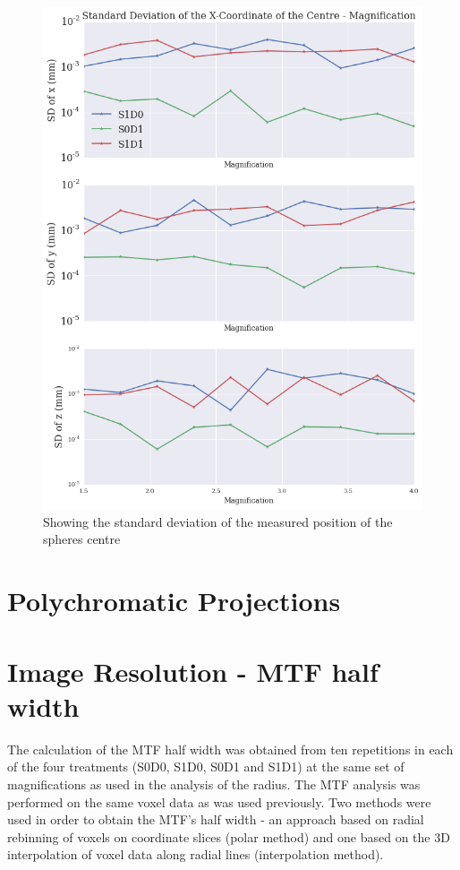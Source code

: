 \documentclass[
  twoside,
  11pt, a4paper,
  footinclude=true,
  headinclude=true,
  cleardoublepage=empty
]{scrbook}
\begin{document}
\begin{figure}[h!]
  \centering
    \includegraphics[width=\textwidth]{figures/output_22_0.png}
    \caption{Showing the standard deviation of the measured position of the spheres centre}
        \label{spherecentrevar}
\end{figure}

\section{Polychromatic Projections}

\section{Image Resolution - MTF half width}

The calculation of the MTF half width was obtained from ten repetitions in each of the four treatments (S0D0, S1D0, S0D1 and S1D1) at the same set of magnifications as used in the analysis of the radius. The MTF analysis was performed on the same voxel data as was used previously. Two methods were used in order to obtain the MTF's half width - an approach based on radial rebinning of voxels on coordinate slices (polar method) and one based on the 3D interpolation of voxel data along radial lines (interpolation method).
\end{document}
